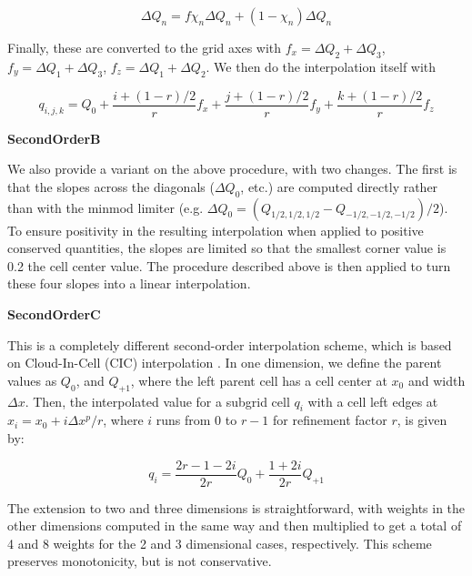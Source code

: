 \begin{equation}
\Delta Q_n = f \chi_n \Delta Q_n + (1-\chi_n) \Delta Q_n
\end{equation}

Finally, these are converted to the grid axes with $f_x = \Delta Q_2 +
\Delta Q_3$, $f_y = \Delta Q_1 + \Delta Q_3$, $f_z = \Delta Q_1 +
\Delta Q_2$.  We then do the interpolation itself with

\begin{equation}
q_{i,j,k} = Q_0 + \frac{i+(1-r)/2}{r} f_x + \frac{j+(1-r)/2}{r} f_y + \frac{k+(1-r)/2}{r} f_z
\end{equation}


\vspace{0.3cm}\noindent
{\bf SecondOrderB} 

We also provide a variant on the above procedure, with two changes.
The first is that the slopes across the diagonals ($\Delta Q_0$, etc.)
are computed directly rather than with the minmod limiter
(e.g. $\Delta Q_0 = (Q_{1/2,1/2,1/2} - Q_{-1/2,-1/2,-1/2})/2$).  To
ensure positivity in the resulting interpolation when applied to
positive conserved quantities, the slopes are limited so that the
smallest corner value is 0.2 the cell center value.  The procedure
described above is then applied to turn these four slopes into a
linear interpolation.


\vspace{0.3cm}\noindent
{\bf SecondOrderC} 

This is a completely different second-order interpolation scheme,
which is based on Cloud-In-Cell (CIC) interpolation \citep{Hockney88}.
In one dimension, we define the parent values as $Q_0$, and $Q_{+1}$,
where the left parent cell has a cell center at $x_0$ and width
$\Delta x$.  Then, the interpolated value for a subgrid cell $q_i$
with a cell left edges at $x_i = x_0 + i \Delta x^p/r$, where $i$ runs
from 0 to $r-1$ for refinement factor $r$, is given by:

\begin{equation}
q_i =  \frac{2r - 1 - 2i}{2r} Q_0 + \frac{1+2i}{2r} Q_{+1}
\end{equation}

The extension to two and three dimensions is straightforward, with
weights in the other dimensions computed in the same way and then
multiplied to get a total of 4 and 8 weights for the 2 and 3
dimensional cases, respectively.  This scheme preserves monotonicity,
but is not conservative.


